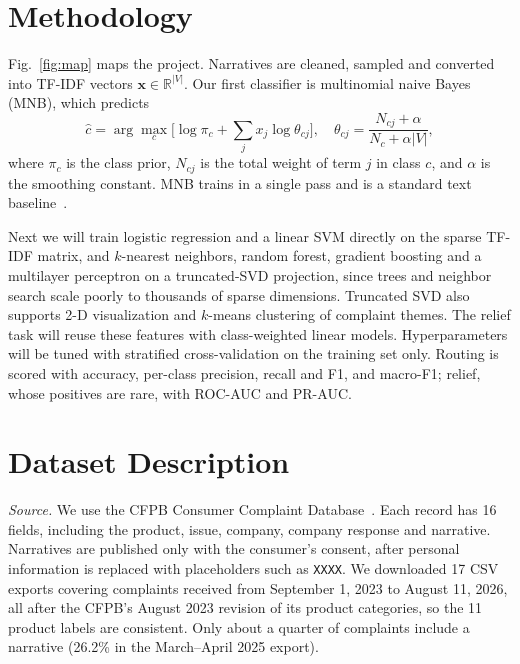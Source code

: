 \documentclass[conference]{IEEEtran}
\begin{document}
\section{Methodology}
Fig.~\ref{fig:map} maps the project. Narratives are cleaned, sampled and converted into TF-IDF vectors $\mathbf{x}\in\mathbb{R}^{|V|}$. Our first classifier is multinomial naive Bayes (MNB), which predicts
\begin{equation}
\hat{c} = \arg\max_{c}\Big[\log \pi_c + \sum_{j} x_j \log \theta_{cj}\Big],\quad
\theta_{cj} = \frac{N_{cj}+\alpha}{N_c+\alpha|V|},
\end{equation}
where $\pi_c$ is the class prior, $N_{cj}$ is the total weight of term $j$ in class $c$, and $\alpha$ is the smoothing constant. MNB trains in a single pass and is a standard text baseline~\cite{mccallum}.

Next we will train logistic regression and a linear SVM directly on the sparse TF-IDF matrix, and $k$-nearest neighbors, random forest, gradient boosting and a multilayer perceptron on a truncated-SVD projection, since trees and neighbor search scale poorly to thousands of sparse dimensions. Truncated SVD also supports 2-D visualization and $k$-means clustering of complaint themes. The relief task will reuse these features with class-weighted linear models. Hyperparameters will be tuned with stratified cross-validation on the training set only. Routing is scored with accuracy, per-class precision, recall and F1, and macro-F1; relief, whose positives are rare, with ROC-AUC and PR-AUC.

\section{Dataset Description}
\label{sec:data}
\textit{Source.} We use the CFPB Consumer Complaint Database~\cite{cfpb}. Each record has 16 fields, including the product, issue, company, company response and narrative. Narratives are published only with the consumer's consent, after personal information is replaced with placeholders such as \texttt{XXXX}. We downloaded 17 CSV exports covering complaints received from September 1, 2023 to August 11, 2026, all after the CFPB's August 2023 revision of its product categories, so the 11 product labels are consistent. Only about a quarter of complaints include a narrative (26.2\% in the March--April 2025 export).
\end{document}
